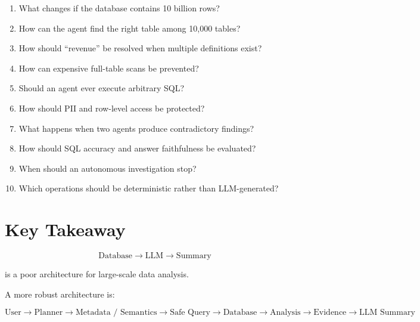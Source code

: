 \documentclass[11pt,a4paper]{article}
\begin{document}
\begin{enumerate}
    \item What changes if the database contains 10 billion rows?
    \item How can the agent find the right table among 10,000 tables?
    \item How should ``revenue'' be resolved when multiple definitions exist?
    \item How can expensive full-table scans be prevented?
    \item Should an agent ever execute arbitrary SQL?
    \item How should PII and row-level access be protected?
    \item What happens when two agents produce contradictory findings?
    \item How should SQL accuracy and answer faithfulness be evaluated?
    \item When should an autonomous investigation stop?
    \item Which operations should be deterministic rather than LLM-generated?
\end{enumerate}

\section{Key Takeaway}

\[
\boxed{\text{Database} \rightarrow \text{LLM} \rightarrow \text{Summary}}
\]

is a poor architecture for large-scale data analysis.

A more robust architecture is:

\[
\boxed{
\text{User}
\rightarrow
\text{Planner}
\rightarrow
\text{Metadata / Semantics}
\rightarrow
\text{Safe Query}
\rightarrow
\text{Database}
\rightarrow
\text{Analysis}
\rightarrow
\text{Evidence}
\rightarrow
\text{LLM Summary}
}
\]

\begin{center}
\end{center}

\tableofcontents
\newpage
\end{document}
